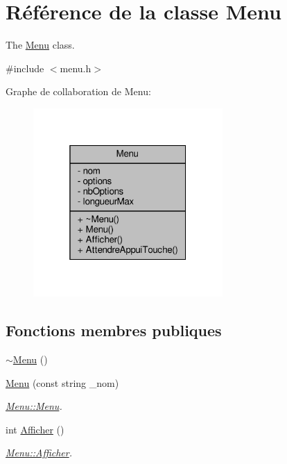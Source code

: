 \hypertarget{class_menu}{}\section{Référence de la classe Menu}
\label{class_menu}


The \hyperlink{class_menu}{Menu} class.  




{\ttfamily \#include $<$menu.\+h$>$}



Graphe de collaboration de Menu\+:
\nopagebreak
\begin{figure}[H]
\begin{center}
\leavevmode
\includegraphics[width=205pt]{class_menu__coll__graph}
\end{center}
\end{figure}
\subsection*{Fonctions membres publiques}
\begin{DoxyCompactItemize}
\item 
\hyperlink{class_menu_a831387f51358cfb88cd018e1777bc980}{$\sim$\+Menu} ()
\item 
\hyperlink{class_menu_a3ec2bde9fc4dfdf5d4e8afcc562fd58f}{Menu} (const string \+\_\+nom)
\begin{DoxyCompactList}\small\item\em \hyperlink{class_menu_a3ec2bde9fc4dfdf5d4e8afcc562fd58f}{Menu\+::\+Menu}. \end{DoxyCompactList}\item 
int \hyperlink{class_menu_a079e0c6a24248a07993b48b310ba65ce}{Afficher} ()
\begin{DoxyCompactList}\small\item\em \hyperlink{class_menu_a079e0c6a24248a07993b48b310ba65ce}{Menu\+::\+Afficher}. \end{DoxyCompactList}\end{DoxyCompactItemize}
